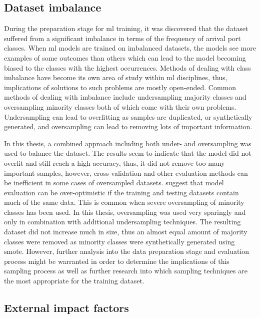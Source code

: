 \subsection{Dataset imbalance}

During the preparation stage for \acrshort{ml} training, it was discovered that the dataset suffered from a significant imbalance in terms of the frequency of arrival port classes. When \acrshort{ml} models are trained on imbalanced datasets, the models see more examples of some outcomes than others which can lead to the model becoming biased to the classes with the highest occurrences. Methods of dealing with class imbalance have become its own area of study within \acrshort{ml} disciplines, thus, implications of solutions to such problems are mostly open-ended. Common methods of dealing with imbalance include undersampling majority classes and oversampling minority classes both of which come with their own problems. Undersampling can lead to overfitting as samples are duplicated, or synthetically generated, and oversampling can lead to removing lots of important information.

In this thesis, a combined approach including both under- and oversampling was used to balance the dataset. The results seem to indicate that the model did not overfit and still reach a high accuracy, thus, it did not remove too many important samples, however, cross-validation and other evaluation methods can be inefficient in some cases of oversampled datasets. \cite{cv_imbalance} suggest that model evaluation can be over-optimistic if the training and testing datasets contain much of the same data. This is common when severe oversampling of minority classes has been used. In this thesis, oversampling was used very sparingly and only in combination with additional undersampling techniques. The resulting dataset did not increase much in size, thus an almost equal amount of majority classes were removed as minority classes were synthetically generated using \acrfull{smote}. However, further analysis into the data preparation stage and evaluation process might be warranted in order to determine the implications of this sampling process as well as further research into which sampling techniques are the most appropriate for the training dataset.

\subsection{External impact factors}

